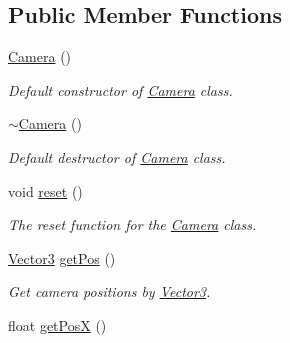 \subsection*{Public Member Functions}
\begin{DoxyCompactItemize}
\item 
\hypertarget{class_camera_a01f94c3543f56ede7af49dc778f19331}{\hyperlink{class_camera_a01f94c3543f56ede7af49dc778f19331}{Camera} ()}\label{class_camera_a01f94c3543f56ede7af49dc778f19331}

\begin{DoxyCompactList}\small\item\em Default constructor of \hyperlink{class_camera}{Camera} class. \end{DoxyCompactList}\item 
\hypertarget{class_camera_ad1897942d0ccf91052386388a497349f}{\hyperlink{class_camera_ad1897942d0ccf91052386388a497349f}{$\sim$\-Camera} ()}\label{class_camera_ad1897942d0ccf91052386388a497349f}

\begin{DoxyCompactList}\small\item\em Default destructor of \hyperlink{class_camera}{Camera} class. \end{DoxyCompactList}\item 
\hypertarget{class_camera_a02be8aa0dbef77e02dddc715a726fb67}{void \hyperlink{class_camera_a02be8aa0dbef77e02dddc715a726fb67}{reset} ()}\label{class_camera_a02be8aa0dbef77e02dddc715a726fb67}

\begin{DoxyCompactList}\small\item\em The reset function for the \hyperlink{class_camera}{Camera} class. \end{DoxyCompactList}\item 
\hypertarget{class_camera_ad8adad1e759bbb6c96b83d92427300f1}{\hyperlink{struct_vector3}{Vector3} \hyperlink{class_camera_ad8adad1e759bbb6c96b83d92427300f1}{get\-Pos} ()}\label{class_camera_ad8adad1e759bbb6c96b83d92427300f1}

\begin{DoxyCompactList}\small\item\em Get camera positions by \hyperlink{struct_vector3}{Vector3}. \end{DoxyCompactList}\item 
\hypertarget{class_camera_a5bdb6874746357edbcb107f794243d68}{float \hyperlink{class_camera_a5bdb6874746357edbcb107f794243d68}{get\-Pos\-X} ()}\label{class_camera_a5bdb6874746357edbcb107f794243d68}


\end{DoxyCompactItemize}
